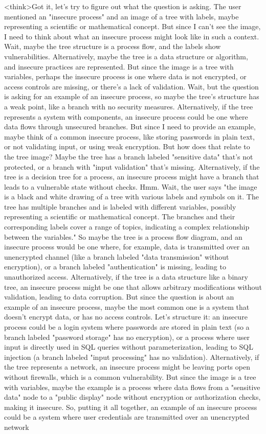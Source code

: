 <think>Got it, let's try to figure out what the question is asking. The user mentioned an "insecure process" and an image of a tree with labels, maybe representing a scientific or mathematical concept. But since I can't see the image, I need to think about what an insecure process might look like in such a context. Wait, maybe the tree structure is a process flow, and the labels show vulnerabilities. Alternatively, maybe the tree is a data structure or algorithm, and insecure practices are represented. But since the image is a tree with variables, perhaps the insecure process is one where data is not encrypted, or access controls are missing, or there's a lack of validation. Wait, but the question is asking for an example of an insecure process, so maybe the tree's structure has a weak point, like a branch with no security measures. Alternatively, if the tree represents a system with components, an insecure process could be one where data flows through unsecured branches. But since I need to provide an example, maybe think of a common insecure process, like storing passwords in plain text, or not validating input, or using weak encryption. But how does that relate to the tree image? Maybe the tree has a branch labeled "sensitive data" that's not protected, or a branch with "input validation" that's missing. Alternatively, if the tree is a decision tree for a process, an insecure process might have a branch that leads to a vulnerable state without checks. Hmm. Wait, the user says "the image is a black and white drawing of a tree with various labels and symbols on it. The tree has multiple branches and is labeled with different variables, possibly representing a scientific or mathematical concept. The branches and their corresponding labels cover a range of topics, indicating a complex relationship between the variables." So maybe the tree is a process flow diagram, and an insecure process would be one where, for example, data is transmitted over an unencrypted channel (like a branch labeled "data transmission" without encryption), or a branch labeled "authentication" is missing, leading to unauthorized access. Alternatively, if the tree is a data structure like a binary tree, an insecure process might be one that allows arbitrary modifications without validation, leading to data corruption. But since the question is about an example of an insecure process, maybe the most common one is a system that doesn't encrypt data, or has no access controls. Let's structure it: an insecure process could be a login system where passwords are stored in plain text (so a branch labeled "password storage" has no encryption), or a process where user input is directly used in SQL queries without parameterization, leading to SQL injection (a branch labeled "input processing" has no validation). Alternatively, if the tree represents a network, an insecure process might be leaving ports open without firewalls, which is a common vulnerability. But since the image is a tree with variables, maybe the example is a process where data flows from a "sensitive data" node to a "public display" node without encryption or authorization checks, making it insecure. So, putting it all together, an example of an insecure process could be a system where user credentials are transmitted over an unencrypted network 